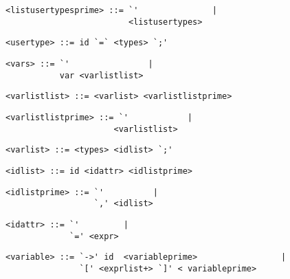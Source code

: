\begin{footnotesize}
\begin{lstlisting}[frame=single, label={listusertypesprime}]
<listusertypesprime> ::= `'               |
                         <listusertypes>
\end{lstlisting}

\begin{lstlisting}[frame=single, label={usertypes}]
<usertype> ::= id `=` <types> `;'
\end{lstlisting}

\begin{lstlisting}[frame=single, label={vars}, language=pie]
<vars> ::= `'                |
           var <varlistlist>
\end{lstlisting}

\begin{lstlisting}[frame=single, label={varlistlist}, language=pie]
<varlistlist> ::= <varlist> <varlistlistprime>
\end{lstlisting}

\begin{lstlisting}[frame=single, label={varlistlistprime}, language=pie]
<varlistlistprime> ::= `'            |
                      <varlistlist>
\end{lstlisting}

\begin{lstlisting}[frame=single, label={varlist}, language=pie]
<varlist> ::= <types> <idlist> `;'
\end{lstlisting}

\begin{lstlisting}[frame=single, label={idlist}, language=pie]
<idlist> ::= id <idattr> <idlistprime>
\end{lstlisting}

\begin{lstlisting}[frame=single, label={idlistprime}, language=pie]
<idlistprime> ::= `'          |
                  `,' <idlist>
\end{lstlisting}

\begin{lstlisting}[frame=single, label={idattr}, language=pie]
<idattr> ::= `'         | 
             `=' <expr> 
\end{lstlisting}

\begin{lstlisting}[frame=single, label={variable}, language=pie]
<variable> ::= `->' id  <variableprime>                 | 
               `[' <exprlist+> `]' < variableprime>
\end{lstlisting}


\end{footnotesize}
